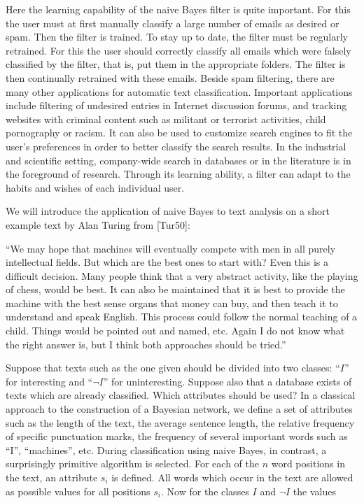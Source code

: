 \documentclass[10pt]{book}
\begin{document}
Here the learning capability of the naive Bayes filter is quite important. For this the user must at first manually classify a large number of emails as desired or spam. Then the filter is trained. To stay up to date, the filter must be regularly retrained. For this the user should correctly classify all emails which were falsely classified by the filter, that is, put them in the appropriate folders. The filter is then continually retrained with these emails.
Beside spam filtering, there are many other applications for automatic text classification. Important applications include filtering of undesired entries in Internet discussion forums, and tracking websites with criminal content such as militant or terrorist activities, child pornography or racism. It can also be used to customize search engines to fit the user's preferences in order to better classify the search results. In the industrial and scientific setting, company-wide search in databases or in the literature is in the foreground of research. Through its learning ability, a filter can adapt to the habits and wishes of each individual user.

We will introduce the application of naive Bayes to text analysis on a short example text by Alan Turing from [Tur50]:

\begin{displayquote}
``We may hope that machines will eventually compete with men in all purely intellectual fields. But which are the best ones to start with? Even this is a difficult decision. Many people think that a very abstract activity, like the playing of chess, would be best. It can also be maintained that it is best to provide the machine with the best sense organs that money can buy, and then teach it to understand and speak English. This process could follow the normal teaching of a child. Things would be pointed out and named, etc. Again I do not know what the right answer is, but I think both approaches should be tried.''
\end{displayquote}

Suppose that texts such as the one given should be divided into two classes: ``$I$'' for interesting and ``$\neg I$'' for uninteresting. Suppose also that a database exists of texts which are already classified. Which attributes should be used? In a classical approach to the construction of a Bayesian network, we define a set of attributes such as the length of the text, the average sentence length, the relative frequency of specific punctuation marks, the frequency of several important words such as ``I'', ``machines'', etc. During classification using naive Bayes, in contrast, a surprisingly primitive algorithm is selected. For each of the $n$ word positions in the text, an attribute $s_{i}$ is defined. All words which occur in the text are allowed as possible values for all positions $s_{i}$. Now for the classes $I$ and $\neg I$ the values
\end{document}
